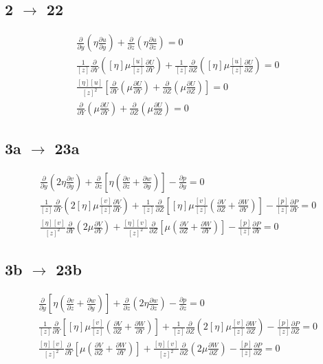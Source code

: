 \documentclass[10pt, letterpaper, twoside]{article}
\newcommand{\pd}[2]{\frac{\partial#1}{\partial#2}}
\begin{document}
	\subsection{2 $ \rightarrow $ 22}
	\begin{gather*}
		\pd{}{y}\left(\eta\pd{u}{y}\right) + \pd{}{z}\left(\eta\pd{u}{z}\right) = 0 \tag{2} \\
		\frac{1}{\left[z\right]}\pd{}{Y}\left(\left[\eta\right]\mu\frac{\left[u\right]}{\left[z\right]}\pd{U}{Y}\right) + \frac{1}{\left[z\right]}\pd{}{Z}\left(\left[\eta\right]\mu\frac{\left[u\right]}{\left[z\right]}\pd{U}{Z}\right) = 0\\
		\frac{\left[\eta\right]\left[u\right]}{\left[z\right]^2}\left[\pd{}{Y}\left(\mu\pd{U}{Y}\right) + \pd{}{Z}\left(\mu\pd{U}{Z}\right)\right] = 0\\
		\pd{}{Y}\left(\mu\pd{U}{Y}\right) + \pd{}{Z}\left(\mu\pd{U}{Z}\right) = 0 \tag{22}
	\end{gather*}
	\subsection{3a $ \rightarrow $ 23a}
	\begin{gather*}
		\pd{}{y}\left(2\eta\pd{v}{y}\right) + \pd{}{z}\left[\eta\left(\pd{v}{z}+\pd{w}{y}\right)\right] - \pd{p}{y} = 0 \tag{3a} \\
		\frac{1}{\left[z\right]}\pd{}{Y}\left(2\left[\eta\right]\mu\frac{\left[v\right]}{\left[z\right]}\pd{V}{Y}\right) + \frac{1}{\left[z\right]}\pd{}{Z}\left[\left[\eta\right]\mu\frac{\left[v\right]}{\left[z\right]}\left(\pd{V}{Z}+\pd{W}{Y}\right)\right] - \frac{\left[p\right]}{\left[z\right]}\pd{P}{Y} = 0\\
		\frac{\left[\eta\right]\left[v\right]}{\left[z\right]^2}\pd{}{Y}\left(2\mu\pd{V}{Y}\right) + \frac{\left[\eta\right]\left[v\right]}{\left[z\right]^2}\pd{}{Z}\left[\mu\left(\pd{V}{Z}+\pd{W}{Y}\right)\right] - \frac{\left[p\right]}{\left[z\right]}\pd{P}{Y} = 0 \tag{3a$'$}
	\end{gather*}
	\subsection{3b $ \rightarrow $ 23b}
	\begin{gather*}
		\pd{}{y}\left[\eta\left(\pd{v}{z}+\pd{w}{y}\right)\right] + \pd{}{z}\left(2\eta\pd{w}{z}\right) - \pd{p}{z} = 0 \tag{3b} \\
		\frac{1}{\left[z\right]}\pd{}{Y}\left[\left[\eta\right]\mu\frac{\left[v\right]}{\left[z\right]}\left(\pd{V}{Z}+\pd{W}{Y}\right)\right] + \frac{1}{\left[z\right]}\pd{}{Z}\left(2\left[\eta\right]\mu\frac{\left[v\right]}{\left[z\right]}\pd{W}{Z}\right) - \frac{\left[p\right]}{\left[z\right]}\pd{P}{Z} = 0\\
		\frac{\left[\eta\right]\left[v\right]}{\left[z\right]^2}\pd{}{Y}\left[\mu\left(\pd{V}{Z}+\pd{W}{Y}\right)\right] + \frac{\left[\eta\right]\left[v\right]}{\left[z\right]^2}\pd{}{Z}\left(2\mu\pd{W}{Z}\right) - \frac{\left[p\right]}{\left[z\right]}\pd{P}{Z} = 0 \tag{3b$'$}
	\end{gather*}
\end{document}
